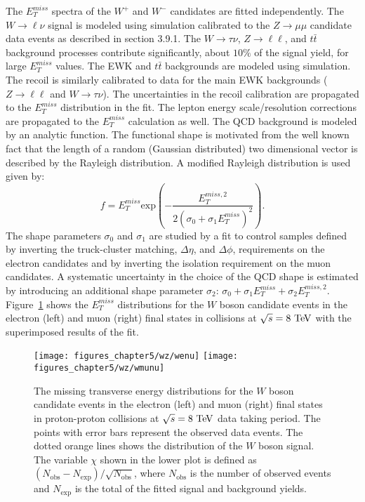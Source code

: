 The $E_{T}^{miss}$ spectra of the $W^{+}$ and $W^{-}$ candidates are fitted independently. The $W \rightarrow \ell \nu$ signal is modeled using simulation calibrated to the $Z \rightarrow \mu\mu$ candidate data events as described in section 3.9.1. The $W \rightarrow \tau \nu$, $Z \rightarrow \ell\ell$, and $t\bar{t}$ background processes contribute significantly, about $10\%$ of the signal yield, for large $E_{T}^{miss}$ values. The EWK and $t\bar{t}$ backgrounds are modeled using simulation.  The recoil is similarly calibrated to data for the main EWK backgrounds ($Z \rightarrow \ell\ell$ and $W \rightarrow \tau \nu$). The uncertainties in the recoil calibration are propagated to the $E_{T}^{miss}$ distribution in the fit. The lepton energy scale/resolution corrections are propagated to the  $E_{T}^{miss}$ calculation as well. The QCD background is modeled by an analytic function. The functional shape is motivated from the well known fact that the length of a random (Gaussian distributed) two dimensional vector is described by the Rayleigh distribution. A modified Rayleigh distribution is used given by:
\begin{equation} \label{eq:rayleigh}
f = E_{T}^{miss} \mathrm{exp} \left(-\frac{E_{T}^{miss,2}}{2(\sigma_0+\sigma_1E_{T}^{miss})^2} \right).
\end{equation}  
The shape parameters $\sigma_0$ and $\sigma_1$ are studied by a fit to control samples defined by inverting the  truck-cluster matching,  $\Delta \eta$, and $\Delta \phi$, requirements on the electron candidates and by inverting the isolation requirement on the muon candidates. A systematic uncertainty in the choice of the QCD shape is estimated by introducing an additional shape parameter $\sigma_2$: $\sigma_0+\sigma_1E_{T}^{miss}+\sigma_2E_{T}^{miss,2}$. Figure~\ref{fig:W8} shows the $E_{T}^{miss}$ distributions for the  $W$ boson candidate events in the electron (left) and muon (right) final states in collisions at $\sqrt{s}=8~\mathrm{Te\kern -0.1em V}$ with the superimposed results of the fit.     
\begin{figure}[htbp]
\centering
\texttt{[image: figures\_chapter5/wz/wenu]}
\texttt{[image: figures\_chapter5/wz/wmunu]}
\caption{The missing transverse energy distributions for the $W$  boson candidate events in the electron (left) and muon (right) final states in proton-proton collisions at $\sqrt{s}=8~\mathrm{Te\kern -0.1em V}$ data taking period.  The points with error bars represent the observed data events. The dotted orange lines shows the distribution of the $W$ boson signal. The variable $\chi$ shown in the lower plot is defined as $(N_{\text{obs}}-N_{\text{exp}})/\sqrt{N_{\text{obs}}}$, where $N_{\text{obs}}$ is the number of observed events and $N_{\text{exp}}$ is the total of the fitted signal and background yields.
\label{fig:W8}}
\end{figure}
